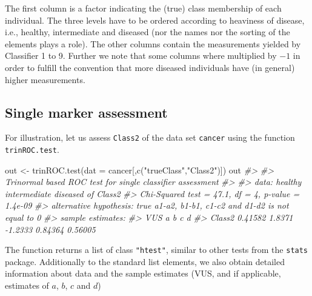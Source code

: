\documentclass[
]{article}
\newenvironment{Shaded}{\begin{snugshade}}{\end{snugshade}}
\newcommand{\AttributeTok}[1]{\textcolor[rgb]{0.77,0.63,0.00}{#1}}
\newcommand{\CommentTok}[1]{\textcolor[rgb]{0.56,0.35,0.01}{\textit{#1}}}
\newcommand{\FunctionTok}[1]{\textcolor[rgb]{0.00,0.00,0.00}{#1}}
\newcommand{\NormalTok}[1]{#1}
\newcommand{\OtherTok}[1]{\textcolor[rgb]{0.56,0.35,0.01}{#1}}
\newcommand{\StringTok}[1]{\textcolor[rgb]{0.31,0.60,0.02}{#1}}
\begin{document}
The first column is a factor indicating the (true) class membership of
each individual. The three levels have to be ordered according to
heaviness of disease, i.e., healthy, intermediate and diseased (nor the
names nor the sorting of the elements plays a role). The other columns
contain the measurements yielded by Classifier 1 to 9. Further we note
that some columns where multiplied by \(-1\) in order to fulfill the
convention that more diseased individuals have (in general) higher
measurements.

\hypertarget{single-marker-assessment}{%
\subsection{Single marker assessment}\label{single-marker-assessment}}

For illustration, let us assess \texttt{Class2} of the data set
\texttt{cancer} using the function \texttt{trinROC.test}.

\begin{Shaded}
\begin{Highlighting}[]
\NormalTok{out }\OtherTok{\textless{}{-}} \FunctionTok{trinROC.test}\NormalTok{(}\AttributeTok{dat =}\NormalTok{ cancer[,}\FunctionTok{c}\NormalTok{(}\StringTok{"trueClass"}\NormalTok{,}\StringTok{"Class2"}\NormalTok{)])}
\NormalTok{out}
\CommentTok{\#\textgreater{} }
\CommentTok{\#\textgreater{}  Trinormal based ROC test for single classifier assessment}
\CommentTok{\#\textgreater{} }
\CommentTok{\#\textgreater{} data:  healthy  intermediate  diseased  of  Class2}
\CommentTok{\#\textgreater{} Chi{-}Squared test = 47.1, df = 4, p{-}value = 1.4e{-}09}
\CommentTok{\#\textgreater{} alternative hypothesis: true a1{-}a2, b1{-}b1, c1{-}c2 and d1{-}d2 is not equal to 0}
\CommentTok{\#\textgreater{} sample estimates:}
\CommentTok{\#\textgreater{}            VUS      a       b       c       d}
\CommentTok{\#\textgreater{} Class2 0.41582 1.8371 {-}1.2333 0.84364 0.56005}
\end{Highlighting}
\end{Shaded}

The function returns a list of class \texttt{"htest"}, similar to other
tests from the \texttt{stats} package. Additionally to the standard list
elements, we also obtain detailed information about data and the sample
estimates (VUS, and if applicable, estimates of \(a\), \(b\), \(c\) and
\(d\))
\end{document}

